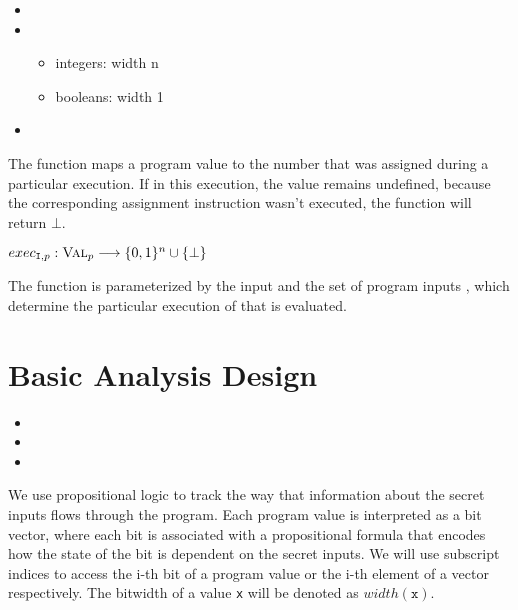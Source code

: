 \begin{itemize}
    \item {}
    \item {}
    \begin{itemize}
        \item integers: width n
        \item booleans: width 1
    \end{itemize}
    \item {}
\end{itemize}

\begin{definition}
The function maps a program value to the number that was assigned during a particular execution. If in this execution, the value remains undefined, because the corresponding assignment instruction wasn't executed, the function will return $\bot$.
    \begin{center}
        $exec_{\mathtt{I}, p}: \textsc{Val}_p \longrightarrow \{0, 1\}^n \cup \{\bot\}$
    \end{center}
The function is parameterized by the input \p and the set of program inputs \I, which determine the particular execution of \p that is evaluated.
\end{definition}

\begin{definition}

    
\end{definition}

\section{Basic Analysis Design}

\begin{itemize}
    \item {}
    \item {}
    \item {}
\end{itemize}

We use propositional logic to track the way that information about the secret inputs flows through the program. Each program value is interpreted as a bit vector, where each bit is associated with a propositional formula that encodes how the state of the bit is dependent on the secret inputs. We will use subscript indices to access the i-th bit of a program value or the i-th element of a vector respectively. The bitwidth of a value \texttt{x} will be denoted as $width(\mathtt{x})$.

